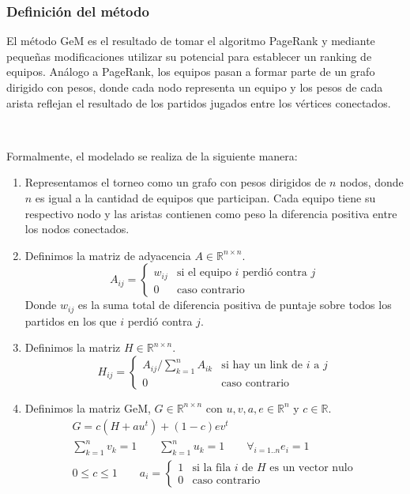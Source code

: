 \subsubsection*{Definición del método}

El método GeM es el resultado de tomar el algoritmo PageRank y mediante pequeñas
modificaciones utilizar su potencial para establecer un ranking de equipos.
Análogo a PageRank, los equipos pasan a formar parte de un grafo dirigido
con pesos, donde cada nodo representa un equipo y los pesos de cada arista
reflejan el resultado de los partidos jugados entre los vértices conectados.

~

Formalmente, el modelado se realiza de la siguiente manera:
\begin{enumerate}
	\item Representamos el torneo como un grafo con pesos dirigidos de $n$
	nodos, donde $n$ es igual a la cantidad de equipos que participan. Cada
	equipo tiene su respectivo nodo y las aristas contienen como peso la
	diferencia positiva entre los nodos conectados.

	\item Definimos la matriz de adyacencia $A \in \mathbb{R}^{n \times n}$.
		\begin{equation*}
			A_{ij} =
				\begin{cases}
					w_{ij} & \text{si el equipo $i$ perdió contra $j$}\\
					0 & \text{caso contrario}
				\end{cases}
		\end{equation*}
		Donde $w_{ij}$ es la suma total de diferencia positiva de puntaje sobre todos
		los partidos en los que $i$ perdió contra $j$.

	\item Definimos la matriz $H \in \mathbb{R}^{n \times n}$.
		\begin{equation*}
			H_{ij} =
				\begin{cases}
					A_{ij}/\sum_{k = 1}^{n}A_{ik} & \text{si hay un link de $i$ a $j$}\\
					0 & \text{caso contrario}
				\end{cases}
		\end{equation*}

	\item Definimos la matriz GeM, $G \in \mathbb{R}^{n \times n}$ con $u, v, a, e \in \mathbb{R}^n$ y $c \in \mathbb{R}$.
		\begin{gather*}
			G = c(H + au^{t}) + (1 - c)ev^{t} \\
			\sum_{k = 1}^{n}v_{k} = 1 \qquad \sum_{k = 1}^{n}u_{k} = 1 \qquad \forall_{i = 1..n} e_{i} = 1 \\
			0 \leq c \leq 1 \qquad
			a_{i} =
			\begin{cases}
				1 & \text{si la fila $i$ de $H$ es un vector nulo} \\
				0 & \text{caso contrario}
			\end{cases}
		\end{gather*}


\end{enumerate}
